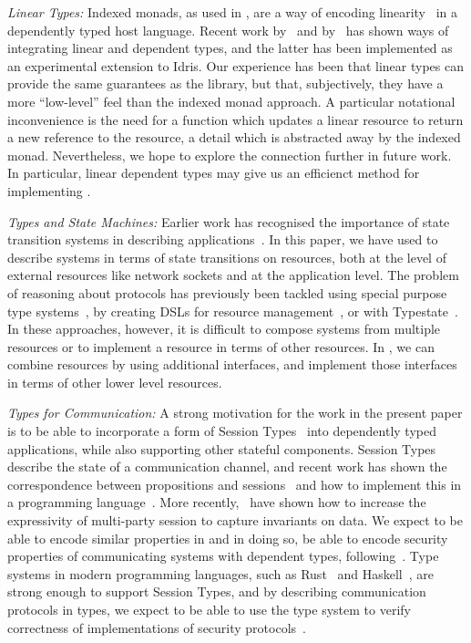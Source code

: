 \emph{\textsf{Linear Types:}}
%
Indexed monads, as used in \states{}, are a way of encoding
linearity~\citep{wadler-linear,Abramsky1993} 
in a dependently typed host language. Recent work by~\citet{neelk2015}
and by~\citet{McBride2016} has shown ways of integrating linear and
dependent types, and the latter has been implemented as an experimental
extension to Idris.
Our experience has been that linear types can provide the same guarantees
as the \states{} library, but that, subjectively, they have a more ``low-level''
feel than the indexed monad approach. A particular notational inconvenience is
the need for a function which updates a linear resource to return a new 
reference to the resource, a detail which is abstracted away by the indexed
monad. Nevertheless, we hope to explore the connection further in future work.
In particular, linear dependent types may give us an efficienct
method for implementing \states{}.

\emph{\textsf{Types and State Machines:}}
%
Earlier work has recognised the importance of state transition systems
in describing applications~\citep{statecharts}.
%
In this paper, we have used \states{} to describe systems in terms
of state transitions on resources,
both at the level of external resources like network sockets and at
the application level.
The problem of reasoning about protocols has previously been
tackled using special purpose type systems~\citep{Walker2000}, by creating
DSLs for resource management~\citep{Brady2010a}, or with
Typestate~\citep{Aldrich2009,Strom1986}. In these approaches, however,
it is difficult to compose systems from multiple resources or to implement a
resource in terms of other resources.  In \states{}, we can combine resources
by using additional interfaces, and implement those interfaces in terms of
other lower level resources.

\emph{\textsf{Types for Communication:}}
%
A strong motivation for the work in the present paper is to be able to
incorporate a form of Session Types~\citep{Honda93,Honda08} into dependently
typed applications, while also supporting other stateful components.  
Session Types describe the state of a communication channel, 
and recent work has shown the correspondence between propositions and 
sessions~\citep{propositions-sessions} and how to implement this in a
programming language~\citep{Lindley2015}. 
More recently,~\citet{Toninho2016} have shown how to increase the
expressivity of multi-party session to capture invariants on data.
We expect
to be able to encode similar properties in \states{} and in doing so, be
able to encode security properties of communicating systems with
dependent types, following~\citep{Guenot2015}.
Type systems in modern programming languages, such as Rust~\citep{session-rust}
and Haskell~\citep{session-haskell}, are strong enough to support Session
Types, and by describing communication protocols in types, we expect to be able
to use the type system to verify correctness of implementations of security
protocols~\citep{gordon2003authenticity,sewell-tls}.

